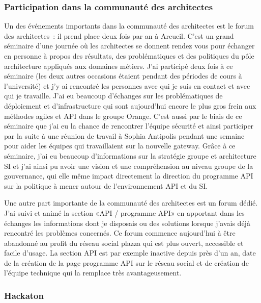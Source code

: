         \subsubsection{Participation dans la communauté des architectes}

        Un des événements importants dans la communauté des architectes est le forum des architectes : il prend place deux fois par an à Arcueil.
        C’est un grand séminaire d’une journée où les architectes se donnent rendez vous pour échanger en personne à propos des résultats, des problématiques et des politiques du pôle architecture appliqués aux domaines métiers.
        J’ai participé deux fois à ce séminaire (les deux autres occasions étaient pendant des périodes de cours à l’université) et j’y ai rencontré les personnes avec qui je suis en contact et avec qui je travaille.
        J’ai eu beaucoup d’échanges sur les problématiques de déploiement et d’infrastructure qui sont aujourd’hui encore le plus gros frein aux méthodes agiles et API dans le groupe Orange.
        C’est aussi par le biais de ce séminaire que j’ai eu la chance de rencontrer l’équipe sécurité et ainsi participer par la suite à une réunion de travail à Sophia Antipolis pendant une semaine pour aider les équipes qui travaillaient sur la nouvelle gateway.
        Grâce à ce séminaire, j’ai eu beaucoup d’informations sur la stratégie groupe et architecture SI et j’ai ainsi pu avoir une vision et une compréhension au niveau groupe de la gouvernance, qui elle même impact directement la direction du programme API sur la politique à mener autour de l’environnement API et du SI.

        Une autre part importante de la communauté des architectes est un forum dédié.
        J’ai suivi et animé la section «API / programme API» en apportant dans les échanges les informations dont je disposais ou des solutions lorsque j’avais déjà rencontré les problèmes concernés.
        Ce forum commence aujourd’hui à être abandonné au profit du réseau social plazza qui est plus ouvert, accessible et facile d’usage.
        La section API est par exemple inactive depuis près d’un an, date de la création de la page programme API sur le réseau social et de création de l’équipe technique qui la remplace très avantageusement.

        \subsubsection{Hackaton}

